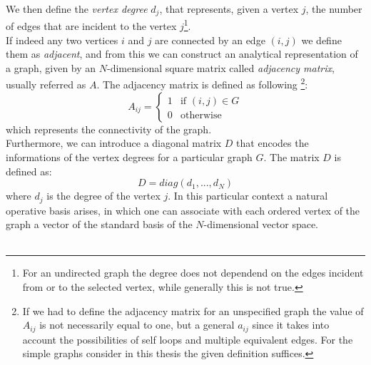 \noindent
We then define the \textit{vertex degree} $d_j$, that represents, given a vertex $j$, the number of edges that are incident to the vertex $j$\footnote{For an undirected graph the degree does not dependend on the edges incident from or to the selected vertex, while generally this is not true.}. \\

\noindent
If indeed any two vertices $i$ and $j$ are connected by an edge $(i,j)$ we define them as \textit{adjacent}, and from this we can construct an analytical representation of a graph, given by an $N$-dimensional square matrix called \textit{adjacency matrix}, usually referred as $A$. The adjacency matrix is defined as following \footnote{If we had to define the adjacency matrix for an unspecified graph the value of $A_{ij}$ is not necessarily equal to one, but a general $a_{ij}$ since it takes into account the possibilities of self loops and multiple equivalent edges. For the simple graphs consider in this thesis the given definition suffices.}:
\begin{equation}
A_{ij} = \begin{cases} 1 & \mbox{if }(i,j)\in G \\ 0 & \mbox{otherwise} \end{cases}
\end{equation}
which represents the connectivity of the graph. \\
Furthermore, we can introduce a diagonal matrix $D$ that encodes the informations of the vertex degrees for a particular graph $G$. The matrix $D$ is defined as:
\begin{equation}
    D = diag(d_1,..., d_N)
\end{equation}
where $d_j$ is the degree of the vertex $j$.
In this particular context a natural operative basis arises, in which one can associate with each ordered vertex of the graph a vector of the standard basis of the $N$-dimensional vector space. \\ \\


